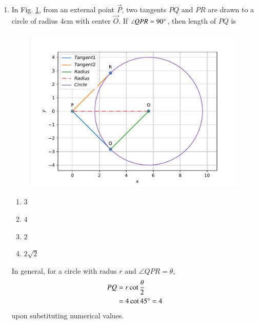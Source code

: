 \documentclass[journal,12pt,twocolumn]{IEEEtran}
\renewcommand\thesection{\arabic{section}}
\begin{document}
\begin{enumerate}[label=\thesection.\arabic*.,ref=\thesection.\theenumi]
\item In Fig. 
	\ref{fig:matrix-10-18.pdf}, from an external point $\vec{P}$, two tangents ${PQ}$ and ${PR}$ are drawn to a circle of radius 4cm with center $\vec{O}$. If $\angle{QPR} = 90\degree$, then length of ${PQ}$ is
  \begin{figure}
	  \centering 
	  \includegraphics[width=\columnwidth]{figs/matrix-10-18.pdf}
	  \caption{}
	  \label{fig:matrix-10-18.pdf}
	  \end{figure}
\begin{enumerate}
    \item $3$
    \item $4$
    \item $2$
    \item $2\sqrt{2}$
\end{enumerate}
\solution In general, for a circle with radus $r$ and $\angle{QPR} = \theta$, 
\begin{align}
	PQ &= r \cot \frac{\theta}{2}
	\\
	&= 4 \cot 45 \degree = 4
\end{align}
upon substituting numerical values.
 

\end{enumerate}
\end{document}
